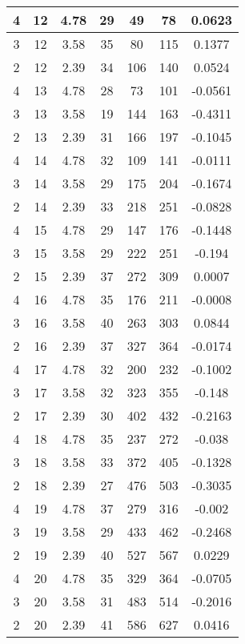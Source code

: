 \documentclass[letterpaper, 12pt]{article}
\begin{document}
\begin{longtable}{|c|c|c|c|c|c|c|}
\hline
4 & 12 & 4.78 & 29 & 49 & 78 & 0.0623 \\
\hline
3 & 12 & 3.58 & 35 & 80 & 115 & 0.1377 \\
\hline
2 & 12 & 2.39 & 34 & 106 & 140 & 0.0524 \\
\hline
4 & 13 & 4.78 & 28 & 73 & 101 & -0.0561 \\
\hline
3 & 13 & 3.58 & 19 & 144 & 163 & -0.4311 \\
\hline
2 & 13 & 2.39 & 31 & 166 & 197 & -0.1045 \\
\hline
4 & 14 & 4.78 & 32 & 109 & 141 & -0.0111 \\
\hline
3 & 14 & 3.58 & 29 & 175 & 204 & -0.1674 \\
\hline
2 & 14 & 2.39 & 33 & 218 & 251 & -0.0828 \\
\hline
4 & 15 & 4.78 & 29 & 147 & 176 & -0.1448 \\
\hline
3 & 15 & 3.58 & 29 & 222 & 251 & -0.194 \\
\hline
2 & 15 & 2.39 & 37 & 272 & 309 & 0.0007 \\
\hline
4 & 16 & 4.78 & 35 & 176 & 211 & -0.0008 \\
\hline
3 & 16 & 3.58 & 40 & 263 & 303 & 0.0844 \\
\hline
2 & 16 & 2.39 & 37 & 327 & 364 & -0.0174 \\
\hline
4 & 17 & 4.78 & 32 & 200 & 232 & -0.1002 \\
\hline
3 & 17 & 3.58 & 32 & 323 & 355 & -0.148 \\
\hline
2 & 17 & 2.39 & 30 & 402 & 432 & -0.2163 \\
\hline
4 & 18 & 4.78 & 35 & 237 & 272 & -0.038 \\
\hline
3 & 18 & 3.58 & 33 & 372 & 405 & -0.1328 \\
\hline
2 & 18 & 2.39 & 27 & 476 & 503 & -0.3035 \\
\hline
4 & 19 & 4.78 & 37 & 279 & 316 & -0.002 \\
\hline
3 & 19 & 3.58 & 29 & 433 & 462 & -0.2468 \\
\hline
2 & 19 & 2.39 & 40 & 527 & 567 & 0.0229 \\
\hline
4 & 20 & 4.78 & 35 & 329 & 364 & -0.0705 \\
\hline
3 & 20 & 3.58 & 31 & 483 & 514 & -0.2016 \\
\hline
2 & 20 & 2.39 & 41 & 586 & 627 & 0.0416 \\
\hline
\end{longtable}
\end{document}
